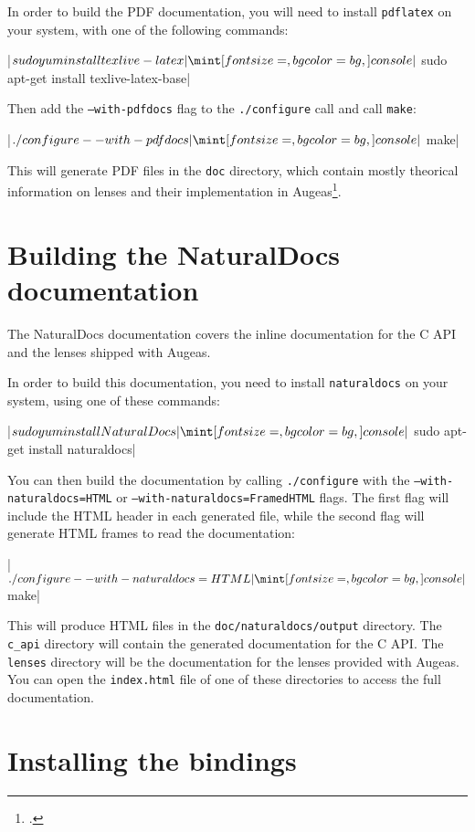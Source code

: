 In order to build the PDF documentation, you will need to install \verb!pdflatex! on your system, with one of the following commands:

\consolecode|$ sudo yum install texlive-latex|
\consolecode|$ sudo apt-get install texlive-latex-base|

Then add the \texttt{--with\allowbreak-pdfdocs} flag to the \texttt{./configure} call and call \texttt{make}:

\consolecode|$ ./configure --with-pdfdocs|
\consolecode|$ make|

This will generate PDF files in the \verb!doc! directory, which contain mostly theorical information on lenses and their implementation in Augeas\footnote{.}.


\section{Building the NaturalDocs documentation}

The NaturalDocs documentation covers the inline documentation for the C API and the lenses shipped with Augeas.


In order to build this documentation, you need to install \verb!naturaldocs! on your system, using one of these commands:

\consolecode|$ sudo yum install NaturalDocs|
\consolecode|$ sudo apt-get install naturaldocs|

You can then build the documentation by calling \texttt{./configure} with the \texttt{--with\allowbreak-naturaldocs=HTML} or \texttt{--with\allowbreak-naturaldocs=FramedHTML} flags. The first flag will include the HTML header in each generated file, while the second flag will generate HTML frames to read the documentation:

\consolecode|$ ./configure --with-naturaldocs=HTML|
\consolecode|$ make|

This will produce HTML files in the \verb!doc/naturaldocs/output! directory. The \verb!c_api! directory will contain the generated documentation for the C API. The \verb!lenses! directory will be the documentation for the lenses provided with Augeas. You can open the \verb!index.html! file of one of these directories to access the full documentation.


\section{Installing the bindings}

